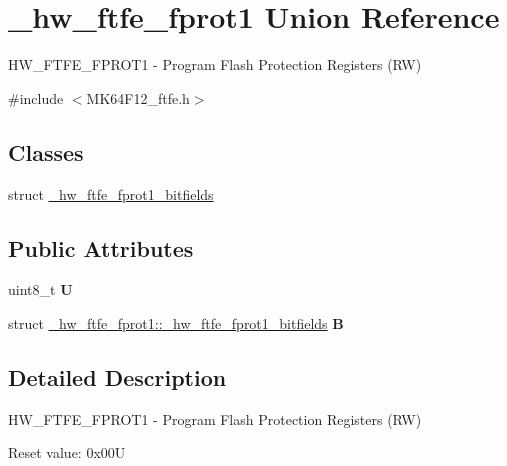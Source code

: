 \hypertarget{union__hw__ftfe__fprot1}{}\section{\+\_\+hw\+\_\+ftfe\+\_\+fprot1 Union Reference}
\label{union__hw__ftfe__fprot1}


H\+W\+\_\+\+F\+T\+F\+E\+\_\+\+F\+P\+R\+O\+T1 -\/ Program Flash Protection Registers (RW)  




{\ttfamily \#include $<$M\+K64\+F12\+\_\+ftfe.\+h$>$}

\subsection*{Classes}
\begin{DoxyCompactItemize}
\item 
struct \hyperlink{struct__hw__ftfe__fprot1_1_1__hw__ftfe__fprot1__bitfields}{\+\_\+hw\+\_\+ftfe\+\_\+fprot1\+\_\+bitfields}
\end{DoxyCompactItemize}
\subsection*{Public Attributes}
\begin{DoxyCompactItemize}
\item 
uint8\+\_\+t {\bfseries U}\hypertarget{union__hw__ftfe__fprot1_a5d21f1d1529c525d09e83e4861bbaca0}{}\label{union__hw__ftfe__fprot1_a5d21f1d1529c525d09e83e4861bbaca0}

\item 
struct \hyperlink{struct__hw__ftfe__fprot1_1_1__hw__ftfe__fprot1__bitfields}{\+\_\+hw\+\_\+ftfe\+\_\+fprot1\+::\+\_\+hw\+\_\+ftfe\+\_\+fprot1\+\_\+bitfields} {\bfseries B}\hypertarget{union__hw__ftfe__fprot1_af803f47c19adbf8703a5f1cb06070b72}{}\label{union__hw__ftfe__fprot1_af803f47c19adbf8703a5f1cb06070b72}

\end{DoxyCompactItemize}


\subsection{Detailed Description}
H\+W\+\_\+\+F\+T\+F\+E\+\_\+\+F\+P\+R\+O\+T1 -\/ Program Flash Protection Registers (RW) 

Reset value\+: 0x00U

